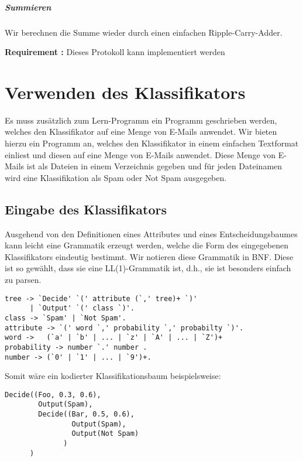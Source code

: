 \documentclass{article}
\newcounter{requirementscount}{}
\newcommand{\requirement}[1] {
        \addtocounter{requirementscount}{1}
        {\bf Requirement \therequirementscount:} #1\\
    }
\begin{document}
\subparagraph{Summieren}
Wir berechnen die Summe wieder durch einen einfachen Ripple-Carry-Adder.\\

\requirement{Dieses Protokoll kann implementiert werden}

\pagebreak  %
\section{Verwenden des Klassifikators}
Es muss zus\"atzlich zum Lern-Programm ein Programm geschrieben
werden, welches den Klassifikator auf eine Menge von E-Mails anwendet.
Wir bieten hierzu ein Programm an, welches den Klassifikator in einem
einfachen Textformat einliest und diesen auf eine Menge von E-Mails
anwendet. Diese Menge von E-Mails ist als Dateien in einem Verzeichnis
gegeben und f\"ur jeden Dateinamen wird eine Klassifikation als Spam
oder Not Spam ausgegeben.
\subsection{Eingabe des Klassifikators}
Ausgehend von den Definitionen eines Attributes und eines Entscheidungsbaumes
kann leicht eine Grammatik erzeugt werden, welche die Form des eingegebenen
Klassifikators eindeutig bestimmt. Wir notieren diese Grammatik in BNF. Diese
ist so gew\"ahlt, dass sie eine LL(1)-Grammatik ist, d.h., sie ist besonders
einfach zu parsen.\\
\begin{verbatim}
tree -> `Decide' `(' attribute (`,' tree)+ `)'
      | `Output' `(' class `)'.
class -> `Spam' | `Not Spam'.
attribute -> `(' word `,' probability `,' probabilty `)'.
word ->   (`a' | `b' | ... | `z' | `A' | ... | `Z')+
probability -> number `.' number .
number -> (`0' | `1' | ... | `9')+.
\end{verbatim}

Somit w\"are ein kodierter Klassifikationsbaum beispielsweise:
\begin{verbatim}
Decide((Foo, 0.3, 0.6),
        Output(Spam), 
        Decide((Bar, 0.5, 0.6), 
                Output(Spam), 
                Output(Not Spam)
              )
      )
\end{verbatim}
\end{document}
